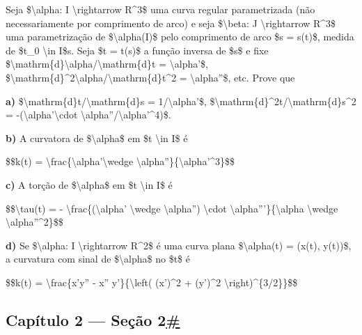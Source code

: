 Seja \$\textbackslash{}alpha: I \textbackslash{}rightarrow R\^{}3\$ uma
curva regular parametrizada (não necessariamente por comprimento de
arco) e seja \$\textbackslash{}beta: J \textbackslash{}rightarrow
R\^{}3\$ uma parametrização de \$\textbackslash{}alpha(I)\$ pelo
comprimento de arco \$s = s(t)\$, medida de \$t\_0 \textbackslash{}in
I\$s. Seja \$t = t(s)\$ a função inversa de \$s\$ e fixe
\$\textbackslash{}mathrm\{d\}\textbackslash{}alpha/\textbackslash{}mathrm\{d\}t
= \textbackslash{}alpha'\$,
\$\textbackslash{}mathrm\{d\}\^{}2\textbackslash{}alpha/\textbackslash{}mathrm\{d\}t\^{}2
= \textbackslash{}alpha''\$, etc. Prove que

\textbf{a)} \$\textbackslash{}mathrm\{d\}t/\textbackslash{}mathrm\{d\}s
= 1/\textbar{}\textbackslash{}alpha'\textbar{}\$,
\$\textbackslash{}mathrm\{d\}\^{}2t/\textbackslash{}mathrm\{d\}s\^{}2 =
-(\textbackslash{}alpha'\textbackslash{}cdot
\textbackslash{}alpha''/\textbar{}\textbackslash{}alpha'\textbar{}\^{}4)\$.

\textbf{b)} A curvatora de \$\textbackslash{}alpha\$ em \$t
\textbackslash{}in I\$ é

\$\$k(t) =
\textbackslash{}frac\{\textbar{}\textbackslash{}alpha'\textbackslash{}wedge
\textbackslash{}alpha''\textbar{}\}\{\textbar{}\textbackslash{}alpha'\textbar{}\^{}3\}\$\$

\textbf{c)} A torção de \$\textbackslash{}alpha\$ em \$t
\textbackslash{}in I\$ é

\$\$\textbackslash{}tau(t) = -
\textbackslash{}frac\{(\textbackslash{}alpha' \textbackslash{}wedge
\textbackslash{}alpha'') \textbackslash{}cdot
\textbackslash{}alpha'''\}\{\textbar{}\textbackslash{}alpha
\textbackslash{}wedge \textbackslash{}alpha''\textbar{}\^{}2\}\$\$

\textbf{d)} Se \$\textbackslash{}alpha: I \textbackslash{}rightarrow
R\^{}2\$ é uma curva plana \$\textbackslash{}alpha(t) = (x(t), y(t))\$,
a curvatura com sinal de \$\textbackslash{}alpha\$ no \$t\$ é

\$\$k(t) = \textbackslash{}frac\{x'y'' - x'' y'\}\{\textbackslash{}left(
(x')\^{}2 + (y')\^{}2 \textbackslash{}right)\^{}\{3/2\}\}\$\$

\hypertarget{capuxedtulo-2--seuxe7uxe3o-2}{%
\subsection{\texorpdfstring{Capítulo 2 --- Seção
2\protect\hyperlink{capuxedtulo-2--seuxe7uxe3o-2}{\#}}{Capítulo 2 --- Seção 2\#}}\label{capuxedtulo-2--seuxe7uxe3o-2}}

